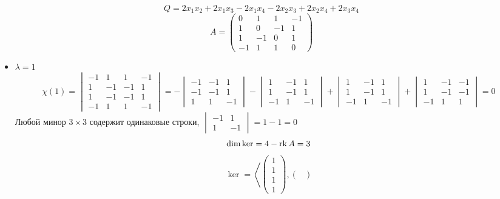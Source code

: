 $$ Q = 2x_1x_2 + 2x_1x_3 - 2x_1x_4 - 2x_2x_3 + 2x_2x_4 + 2x_3x_4 $$
$$ A =
\begin{pmatrix}
	0 & 1 & 1 & -1 \\
    1 & 0 & -1 & 1 \\
    1 & -1 & 0 & 1 \\
    -1 & 1 & 1 & 0
\end{pmatrix} $$
\begin{itemize}
	\item $ \lambda = 1 $
    $$ \chi(1) =
    \begin{vmatrix}
        -1 & 1 & 1 & -1 \\
        1 & -1 & -1 & 1 \\
        1 & -1 & -1 & 1 \\
        -1 & 1 & 1 & -1
    \end{vmatrix} = -
    \begin{vmatrix}
        -1 & -1 & 1 \\
        -1 & -1 & 1 \\
        1 & 1 & -1
    \end{vmatrix} -
    \begin{vmatrix}
        1 & -1 & 1 \\
        1 & -1 & 1 \\
        -1 & 1 & -1
    \end{vmatrix} +
    \begin{vmatrix}
        1 & -1 & 1 \\
        1 & -1 & 1 \\
        -1 & 1 & -1
    \end{vmatrix} +
    \begin{vmatrix}
        1 & -1 & -1 \\
        1 & -1 & -1 \\
        -1 & 1 & 1
    \end{vmatrix} = 0 $$
    Любой минор $ 3 \times 3 $ содержит одинаковые строки, $
    \begin{vmatrix}
        -1 & 1 \\
        1 & -1
    \end{vmatrix} = 1 - 1 = 0 $
    $$ \dim \ker = 4 - \rk A = 3 $$
    $$ \ker = \left\langle
    \begin{pmatrix}
    	1 \\
        1 \\
        1 \\
        1
    \end{pmatrix},
    \begin{pmatrix}

\end{pmatrix}$$
\end{itemize}
